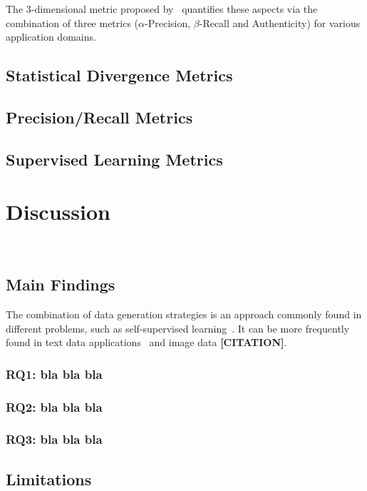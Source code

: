 \documentclass[parskip=full]{scrartcl}
\begin{document}
The 3-dimensional metric proposed by~\citet{alaa2022faithful} quantifies these
aspects via the combination of three metrics ($\alpha$-Precision,
$\beta$-Recall and Authenticity) for various application domains.

\subsection{Statistical Divergence Metrics} 

\subsection{Precision/Recall Metrics}

\subsection{Supervised Learning Metrics}

\section{Discussion}~\label{sec:discussion}

\subsection{Main Findings}

The combination of data generation strategies is an approach commonly found in
different problems, such as self-supervised
learning~\cite{grill2020bootstrap}. It can be more frequently found in text
data applications~\cite{bayer2021survey} and image data \textbf{[CITATION]}.

\subsubsection{RQ1: bla bla bla}

\subsubsection{RQ2: bla bla bla}

\subsubsection{RQ3: bla bla bla}

\subsection{Limitations}
\end{document}
